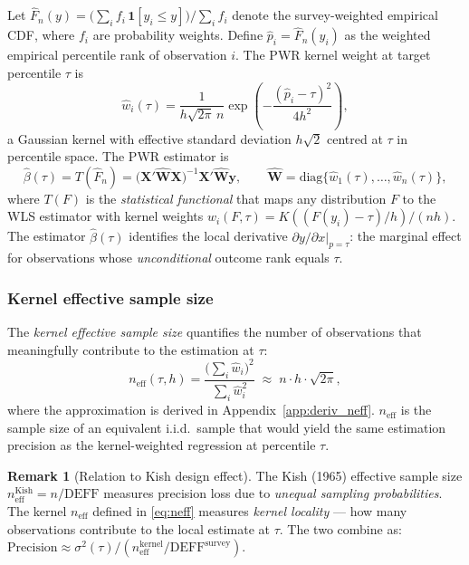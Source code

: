 \documentclass[12pt,a4paper]{article}
\theoremstyle{definition}
\newtheorem{remark}{Remark}
\newcommand{\bX}{\mathbf{X}}
\newcommand{\hbeta}{\hat{\beta}}
\newcommand{\hp}{\hat{p}}
\newcommand{\hw}{\hat{w}}
\newcommand{\hF}{\hat{F}}
\begin{document}
Let $\hF_n(y) = \bigl(\sum_i f_i\,\mathbf{1}[y_i\leq y]\bigr)/\sum_i
f_i$ denote the survey-weighted empirical CDF, where $f_i$ are
probability weights. Define $\hat{p}_i = \hF_n(y_i)$ as the
weighted empirical percentile rank of observation $i$. The PWR kernel
weight at target percentile $\tau$ is
\begin{equation}
  \hw_i(\tau)
  = \frac{1}{h\sqrt{2\pi}\,n}
    \exp\!\left(-\frac{(\hp_i - \tau)^2}{4h^2}\right),
  \label{eq:pwrweights}
\end{equation}
a Gaussian kernel with effective standard deviation $h\sqrt{2}$ centred
at $\tau$ in percentile space.
The PWR estimator is
\begin{equation}
  \hbeta(\tau) = T(\hF_n)
  = \bigl(\bX'\hat{\bm{W}}\bX\bigr)^{-1}\bX'\hat{\bm{W}}\mathbf{y},
  \qquad
  \hat{\bm{W}} = \mathrm{diag}\{\hw_1(\tau),\ldots,\hw_n(\tau)\},
  \label{eq:pwr}
\end{equation}
where $T(F)$ is the \emph{statistical functional} that maps any
distribution $F$ to the WLS estimator with kernel weights
$w_i(F,\tau) = K((F(y_i)-\tau)/h)/(nh)$.
The estimator $\hbeta(\tau)$ identifies the local derivative
$\partial y/\partial x\big|_{p=\tau}$: the marginal effect for
observations whose \textit{unconditional} outcome rank equals $\tau$.

\subsubsection{Kernel effective sample size}
\label{sec:neff}

The \emph{kernel effective sample size} quantifies the number of
observations that meaningfully contribute to the estimation at $\tau$:
\begin{equation}
  n_{\mathrm{eff}}(\tau,h) =
  \frac{\bigl(\sum_i \hw_i\bigr)^2}{\sum_i \hw_i^2}
  \;\approx\; n\cdot h\cdot\sqrt{2\pi},
  \label{eq:neff}
\end{equation}
where the approximation is derived in Appendix~\ref{app:deriv_neff}.
$n_{\mathrm{eff}}$ is the sample size of an equivalent i.i.d.\ sample
that would yield the same estimation precision as the kernel-weighted
regression at percentile $\tau$.

\begin{remark}[Relation to Kish design effect]
The Kish (1965) effective sample size $n_{\mathrm{eff}}^{\mathrm{Kish}}
= n/\mathrm{DEFF}$ measures precision loss due to \textit{unequal
sampling probabilities}. The kernel $n_{\mathrm{eff}}$ defined in
\eqref{eq:neff} measures \textit{kernel locality} --- how many
observations contribute to the local estimate at $\tau$. The two
combine as:
$\mathrm{Precision} \approx \sigma^2(\tau)/
(n_{\mathrm{eff}}^{\mathrm{kernel}}/\mathrm{DEFF}^{\mathrm{survey}})$.
\end{remark}
\end{document}
